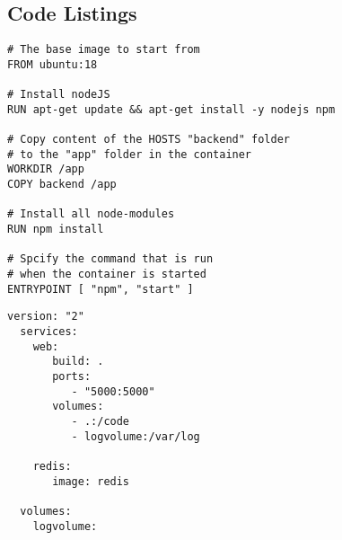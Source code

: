 
\subsection{Code Listings}
\begin{lstlisting}[language=docker, frame=single, caption={Exemplary NodeJS Dockerfile},label=code::docker]
# The base image to start from
FROM ubuntu:18

# Install nodeJS
RUN apt-get update && apt-get install -y nodejs npm

# Copy content of the HOSTS "backend" folder
# to the "app" folder in the container
WORKDIR /app
COPY backend /app

# Install all node-modules
RUN npm install

# Spcify the command that is run
# when the container is started
ENTRYPOINT [ "npm", "start" ]

\end{lstlisting}


\begin{lstlisting}[language=docker-compose-2,caption={Example docker-compose.yml},breaklines=true,label={code::compose}]
version: "2"
  services:
    web:
       build: .
       ports:
          - "5000:5000"
       volumes:
          - .:/code
          - logvolume:/var/log

    redis:
       image: redis

  volumes:
    logvolume:
\end{lstlisting}
